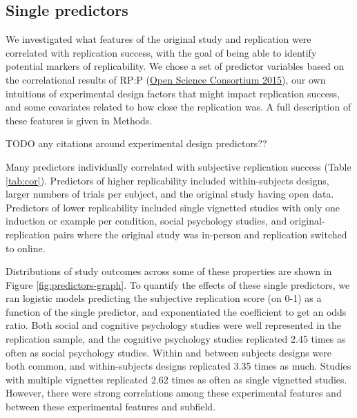 \documentclass[
  english,
  a4paper,
]{article}
\begin{document}
\hypertarget{single-predictors}{%
\subsection{Single predictors}\label{single-predictors}}

We investigated what features of the original study and replication were correlated with replication success, with the goal of being able to identify potential markers of replicability. We chose a set of predictor variables based on the correlational results of RP:P (\protect\hyperlink{ref-openscienceconsortium2015}{Open Science Consortium 2015}), our own intuitions of experimental design factors that might impact replication success, and some covariates related to how close the replication was. A full description of these features is given in Methods.

TODO any citations around experimental design predictors??

Many predictors individually correlated with subjective replication success (Table \ref{tab:cor}). Predictors of higher replicability included within-subjects designs, larger numbers of trials per subject, and the original study having open data. Predictors of lower replicability included single vignetted studies with only one induction or example per condition, social psychology studies, and original-replication pairs where the original study was in-person and replication switched to online.

Distributions of study outcomes across some of these properties are shown in Figure \ref{fig:predictors-graph}. To quantify the effects of these single predictors, we ran logistic models predicting the subjective replication score (on 0-1) as a function of the single predictor, and exponentiated the coefficient to get an odds ratio. Both social and cognitive psychology studies were well represented in the replication sample, and the cognitive psychology studies replicated 2.45 times as often as social psychology studies. Within and between subjects designs were both common, and within-subjects designs replicated 3.35 times as much. Studies with multiple vignettes replicated 2.62 times as often as single vignetted studies. However, there were strong correlations among these experimental features and between these experimental features and subfield.
\end{document}
